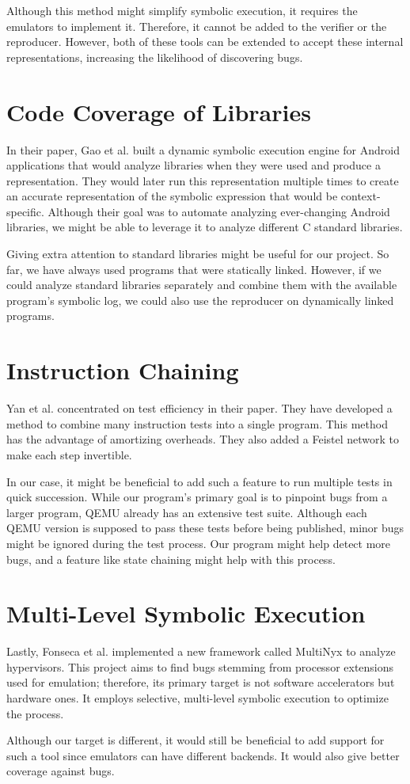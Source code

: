 Although this method might simplify symbolic execution, it requires the emulators to implement it.
Therefore, it cannot be added to the verifier or the reproducer.
However, both of these tools can be extended to accept these internal representations, increasing the likelihood of discovering bugs.

\section{Code Coverage of Libraries}
In their paper, Gao et al. \cite{ao2018android} built a dynamic symbolic execution engine for Android applications that would analyze libraries when they were used and produce a representation.
They would later run this representation multiple times to create an accurate representation of the symbolic expression that would be context-specific.
Although their goal was to automate analyzing ever-changing Android libraries, we might be able to leverage it to analyze different C standard libraries. 

Giving extra attention to standard libraries might be useful for our project.
So far, we have always used programs that were statically linked. However, if we could analyze standard libraries separately and combine them with the available program's symbolic log, we could also use the reproducer on dynamically linked programs.

\section{Instruction Chaining}
Yan et al. \cite{yan2018fast} concentrated on test efficiency in their paper.
They have developed a method to combine many instruction tests into a single program.
This method has the advantage of amortizing overheads.
They also added a Feistel network to make each step invertible.

In our case, it might be beneficial to add such a feature to run multiple tests in quick succession.
While our program's primary goal is to pinpoint bugs from a larger program, QEMU already has an extensive test suite.
Although each QEMU version is supposed to pass these tests before being published, minor bugs might be ignored during the test process.
Our program might help detect more bugs, and a feature like state chaining might help with this process.

\section{Multi-Level Symbolic Execution}
Lastly, Fonseca et al. \cite{fonseca2018multinyx} implemented a new framework called MultiNyx to analyze hypervisors.
This project aims to find bugs stemming from processor extensions used for emulation; therefore, its primary target is not software accelerators but hardware ones.
It employs selective, multi-level symbolic execution to optimize the process.

Although our target is different, it would still be beneficial to add support for such a tool since emulators can have different backends.
It would also give better coverage against bugs.